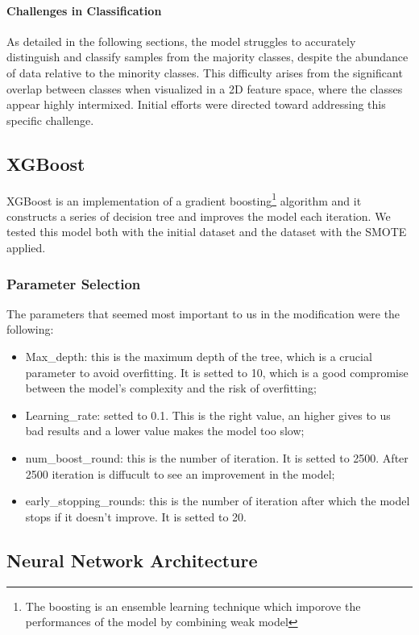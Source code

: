 \documentclass[10pt,twocolumn,letterpaper]{article}
\begin{document}
\paragraph{Challenges in Classification}
As detailed in the following sections, the model struggles to accurately distinguish and classify samples from the majority classes, despite the abundance of data relative to the minority classes. This difficulty arises from the significant overlap between classes when visualized in a 2D feature space, where the classes appear highly intermixed. Initial efforts were directed toward addressing this specific challenge.



\subsection{XGBoost}
XGBoost is an implementation of a gradient boosting\footnote{The boosting is an ensemble learning technique which 
imporove the performances of the model by combining weak model} algorithm and it constructs a series of decision
tree and improves the model each iteration. We tested this model both with the initial dataset and the dataset with the 
SMOTE applied.
\subsubsection{Parameter Selection}
The parameters that seemed most important to us in the modification were the following:
\begin{itemize}
    \item Max\_depth: this is the maximum depth of the tree, which is a crucial parameter to avoid overfitting. 
    It is setted to 10, which is a good compromise between the model's complexity and the risk of overfitting;
    \item Learning\_rate: setted to 0.1. This is the right value, an higher gives to us bad results and a lower 
    value makes the model too slow;
    \item num\_boost\_round: this is the number of iteration. It is setted to 2500. After 2500 iteration 
    is diffucult to see an improvement in the model;
    \item early\_stopping\_rounds: this is the number of iteration after which the model stops if it doesn't 
    improve. It is setted to 20.
\end{itemize}

\subsection{Neural Network Architecture}
\end{document}
